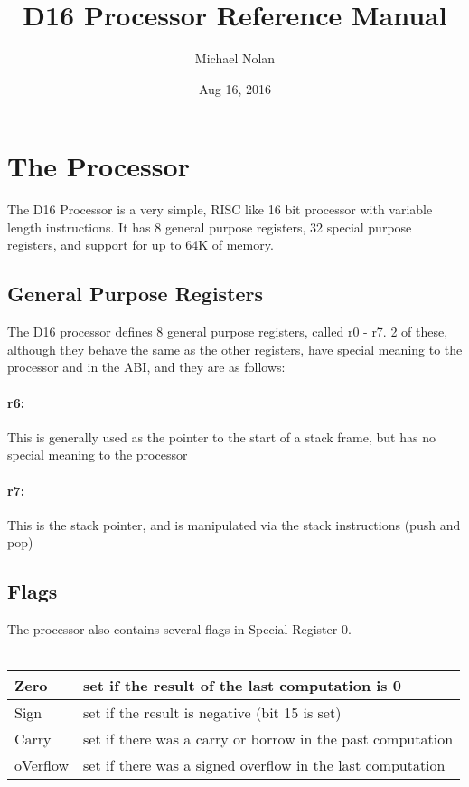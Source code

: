\documentclass{article}
\title{D16 Processor Reference Manual}
\date{Aug 16, 2016}
\author{Michael Nolan}
\begin{document}
        \maketitle
        \newpage
        \tableofcontents
        \newpage
        
        \section{The Processor}
        The D16 Processor is a very simple, RISC like 16 bit processor with variable length instructions. It has 8 general purpose registers, 32 special purpose registers, and support for up to 64K of memory.
        \subsection{General Purpose Registers}
        The D16 processor defines 8 general purpose registers, called r0 - r7. 2 of these, although they behave the same as the other registers, have special meaning to the processor and in the ABI, and they are as follows: \newline
                \paragraph{r6:} This is generally used as the pointer to the start of a stack frame, but has no special meaning to the processor
                \paragraph{r7:} This is the stack pointer, and is manipulated via the stack instructions (push and pop)
        \subsection{Flags}
                The processor also contains several flags in Special Register 0. \\ \\
                \begin{tabular}{| l | l |}
                \hline
                        Zero & set if the result of the last computation is 0 \\ \hline
                        Sign & set if the result is negative (bit 15 is set) \\ \hline
                        Carry & set if there was a carry or borrow in the past computation \\ \hline
                        oVerflow & set if there was a signed overflow in the last computation \\ \hline
                \end{tabular}
\end{document}
